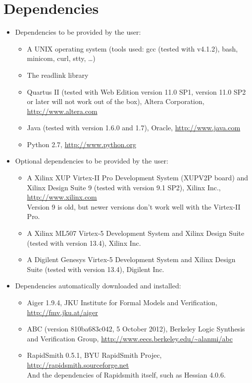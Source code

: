 \documentclass[a4paper,oneside]{memoir}
\begin{document}
\section{Dependencies}
\begin{itemize}
\item Dependencies to be provided by the user:
\begin{itemize}
\item A UNIX operating system (tools used: gcc (tested with v4.1.2), bash, minicom, curl, stty, \dots)
\item The readlink library
\item Quartus II (tested with Web Edition version 11.0 SP1, version 11.0 SP2 or later will not work out of the box), Altera Corporation, \url{http://www.altera.com}
\item Java (tested with version 1.6.0 and 1.7), Oracle, \url{http://www.java.com}
\item Python 2.7, \url{http://www.python.org}
\end{itemize}
\item Optional dependencies to be provided by the user:
\begin{itemize}
\item A Xilinx XUP Virtex-II Pro Development System (XUPV2P board) and Xilinx Design Suite 9 (tested with version 9.1 SP2), Xilinx Inc., \url{http://www.xilinx.com}\\ %
Version 9 is old, but newer versions don't work well with the Virtex-II Pro.
\item A Xilinx ML507 Virtex-5 Development System and Xilinx Design Suite (tested with version 13.4), Xilinx Inc.
\item A Digilent Genesys Virtex-5 Development System and Xilinx Design Suite (tested with version 13.4), Digilent Inc.
\end{itemize}
\item Dependencies automatically downloaded and installed:
\begin{itemize}
\item Aiger 1.9.4, JKU Institute for Formal Models and Verification, \url{http://fmv.jku.at/aiger}
\item ABC (version 810ba683c042, 5 October 2012), Berkeley Logic Synthesis and Verification Group, \url{http://www.eecs.berkeley.edu/\~alanmi/abc}
\item RapidSmith 0.5.1, BYU RapidSmith Projec,  \url{http://rapidsmith.sourceforge.net}\\
And the dependencies of Rapidsmith itself, such as Hessian 4.0.6.
\end{itemize}
\end{itemize}
\end{document}
